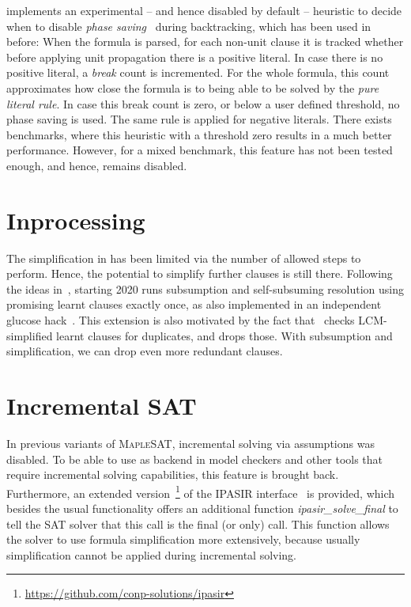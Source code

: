 \documentclass[conference]{IEEEtran}
\begin{document}
\mergesat implements an experimental -- and hence disabled by default -- heuristic to decide when to disable \emph{phase saving}~\cite{Pipatsrisawat:2007:LCC:1768142.1768170} during backtracking, which has been used in \riss~\cite{riss71} before:
When the formula is parsed, for each non-unit clause it is tracked whether before applying unit propagation there is a positive literal.
In case there is no positive literal, a \emph{break} count is incremented.
For the whole formula, this count approximates how close the formula is to being able to be solved by the \emph{pure literal rule}.
In case this break count is zero, or below a user defined threshold, no phase saving is used.
The same rule is applied for negative literals.
There exists benchmarks, where this heuristic with a threshold zero results in a much better performance.
However, for a mixed benchmark, this feature has not been tested enough, and hence, remains disabled.

\section{Inprocessing}

The simplification in \mergesat has been limited via the number of allowed steps to perform.
Hence, the potential to simplify further clauses is still there.
Following the ideas in~\cite{precosat}, starting 2020 \mergesat runs subsumption and self-subsuming resolution using promising learnt clauses exactly once, as also implemented in an independent glucose hack~\cite{GlucoseWithInprocessing2020}.
This extension is also motivated by the fact that~\cite{MapleLCMDistChronoBTDL} checks LCM-simplified learnt clauses for duplicates, and drops those.
With subsumption and simplification, we can drop even more redundant clauses.

\section{Incremental SAT}

In previous variants of \textsc{MapleSAT}, incremental solving via assumptions was disabled.
To be able to use \mergesat as backend in model checkers and other tools that require incremental solving capabilities, this feature is brought back.
Furthermore, an extended version~\footnote{\url{https://github.com/conp-solutions/ipasir}} of the IPASIR interface~\cite{BalyoBiereIserSinz-AI-16} is provided, which besides the usual functionality offers an additional
function \emph{ipasir\_solve\_final} to tell the SAT solver that this call is the final (or only) call.
This function allows the solver to use formula simplification more extensively, because usually simplification cannot be applied during incremental solving.
\end{document}
